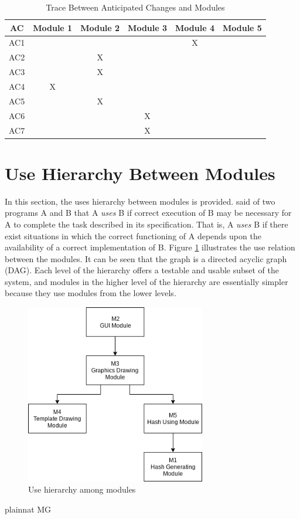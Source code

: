 \documentclass[12pt, titlepage]{article}
\begin{document}
\begin{table}[H]
\centering
\begin{tabular}{| c | c | c | c | c | c |}
\toprule
\textbf{AC} & \textbf{Module 1} & \textbf{Module 2} & \textbf{Module 3} & \textbf{Module 4} & \textbf{Module 5}\\
\toprule
AC1 &  &  &  & X &  \\
AC2 &  & X &  &  &  \\
AC3 &  & X &  &  &  \\
AC4 & X &  &  &  &  \\
AC5 &  & X &  &  &  \\
AC6 &  &  & X &  &  \\
AC7 &  &  & X &  &  \\
\bottomrule
\end{tabular}
\caption{Trace Between Anticipated Changes and Modules}
\label{TblACT}
\end{table}

\section{Use Hierarchy Between Modules} \label{SecUse}

In this section, the uses hierarchy between modules is
provided. \citet{Parnas1978} said of two programs A and B that A {\em uses} B if
correct execution of B may be necessary for A to complete the task described in
its specification. That is, A {\em uses} B if there exist situations in which
the correct functioning of A depends upon the availability of a correct
implementation of B.  Figure \ref{FigUH} illustrates the use relation between
the modules. It can be seen that the graph is a directed acyclic graph
(DAG). Each level of the hierarchy offers a testable and usable subset of the
system, and modules in the higher level of the hierarchy are essentially simpler
because they use modules from the lower levels.

\begin{figure}[H]
\centering
\includegraphics[width=0.7\textwidth]{UsesHierarchy.png}
\caption{Use hierarchy among modules}
\label{FigUH}
\end{figure}


 {plainnat}
 {MG}
\end{document}
